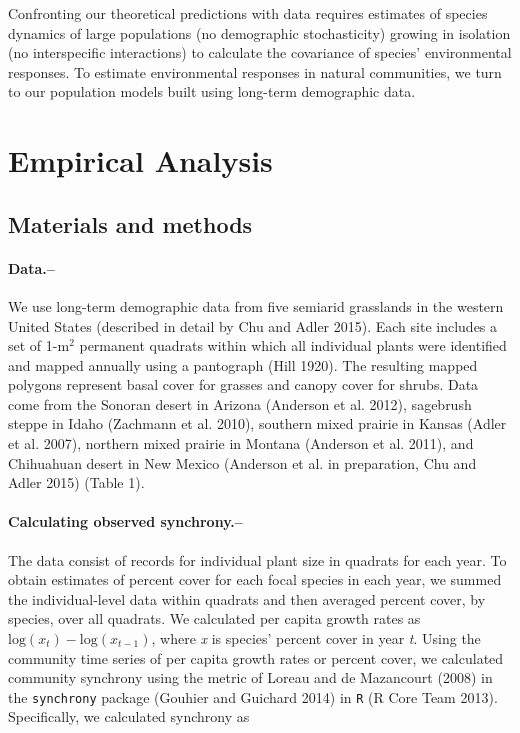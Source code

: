 \documentclass[12pt,]{article}
\begin{document}
Confronting our theoretical predictions with data requires estimates of
species dynamics of large populations (no demographic stochasticity)
growing in isolation (no interspecific interactions) to calculate the
covariance of species' environmental responses. To estimate
environmental responses in natural communities, we turn to our
population models built using long-term demographic data.

\section{Empirical Analysis}\subsection{Materials and methods}

\paragraph{Data.--}\label{data.}

We use long-term demographic data from five semiarid grasslands in the
western United States (described in detail by Chu and Adler 2015). Each
site includes a set of 1-\(\text{m}^2\) permanent quadrats within which
all individual plants were identified and mapped annually using a
pantograph (Hill 1920). The resulting mapped polygons represent basal
cover for grasses and canopy cover for shrubs. Data come from the
Sonoran desert in Arizona (Anderson et al. 2012), sagebrush steppe in
Idaho (Zachmann et al. 2010), southern mixed prairie in Kansas (Adler et
al. 2007), northern mixed prairie in Montana (Anderson et al. 2011), and
Chihuahuan desert in New Mexico (Anderson et al. in preparation, Chu and
Adler 2015) (Table 1).

\paragraph{Calculating observed
synchrony.--}\label{calculating-observed-synchrony.}

The data consist of records for individual plant size in quadrats for
each year. To obtain estimates of percent cover for each focal species
in each year, we summed the individual-level data within quadrats and
then averaged percent cover, by species, over all quadrats. We
calculated per capita growth rates as
\(\text{log}(x_t) - \text{log}(x_{t-1})\), where \emph{x} is species'
percent cover in year \emph{t}. Using the community time series of per
capita growth rates or percent cover, we calculated community synchrony
using the metric of Loreau and {{de Mazancourt}} (2008) in the
\texttt{synchrony} package (Gouhier and Guichard 2014) in \texttt{R} (R Core Team 2013).
Specifically, we calculated synchrony as
\end{document}

